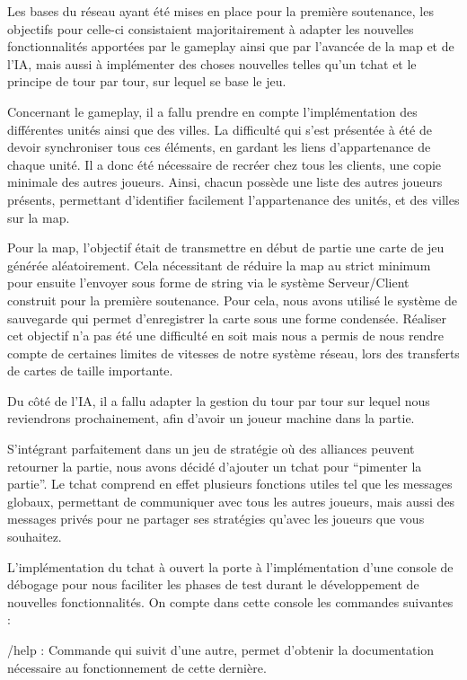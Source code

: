 \documentclass[12pt]{report}
\begin{document}
Les bases du réseau ayant été mises en place pour la première soutenance, les
objectifs pour celle-ci consistaient majoritairement à adapter les nouvelles
fonctionnalités apportées par le gameplay ainsi que par l’avancée de la map et
de l’IA, mais aussi à implémenter des choses nouvelles telles qu’un tchat et le
principe de tour par tour, sur lequel se base le jeu.

Concernant le gameplay, il a fallu prendre en compte l’implémentation des
différentes unités ainsi que des villes. La difficulté qui s’est présentée à
été de devoir synchroniser tous ces éléments, en gardant les liens
d'appartenance de chaque unité. Il a donc été nécessaire de recréer chez tous
les clients, une copie minimale des autres joueurs. Ainsi, chacun possède une
liste des autres joueurs présents, permettant d'identifier facilement
l'appartenance des unités, et des villes sur la map.

Pour la map, l’objectif était de transmettre en début de partie une carte de
jeu générée aléatoirement. Cela nécessitant de réduire la map au strict minimum
pour ensuite l’envoyer sous forme de string via le système Serveur/Client
construit pour la première soutenance. Pour cela, nous avons utilisé le système
de sauvegarde qui permet d’enregistrer la carte sous une forme condensée.
Réaliser cet objectif n’a pas été une difficulté en soit mais nous a permis de
nous rendre compte de certaines limites de vitesses de notre système réseau,
lors des transferts de cartes de taille importante.

Du côté de l’IA, il a fallu adapter la gestion du tour par tour sur lequel nous
reviendrons prochainement, afin d'avoir un joueur machine dans la partie.

S'intégrant parfaitement dans un jeu de stratégie où des alliances peuvent
retourner la partie, nous avons décidé d’ajouter un tchat pour “pimenter la
partie”. Le tchat comprend en effet plusieurs fonctions utiles tel que les
messages globaux, permettant de communiquer avec tous les autres joueurs, mais
aussi des messages privés pour ne partager ses stratégies qu’avec les joueurs
que vous souhaitez.

L’implémentation du tchat à ouvert la porte à l’implémentation d’une console de
débogage pour nous faciliter les phases de test durant le développement de
nouvelles fonctionnalités. On compte dans cette console les commandes
suivantes : 

/help : Commande qui suivit d’une autre, permet d’obtenir la documentation
nécessaire au fonctionnement de cette dernière.
\end{document}
